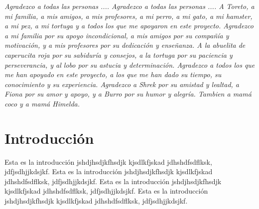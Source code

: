 \documentclass[12pt,letterpaper,spanish]{report}
\newenvironment{dedication}{\newpage\large\null\em\vskip1in}%
{\vfill}
\begin{document}
        \thispagestyle{empty}

        \begin{dedication}
           Agradezco a todas las personas .... Agradezco a todas las personas ....
           A Toreto, a mi familia, a mis amigos, a mis profesores, a mi perro, a mi gato, a mi hamster, a mi pez, a mi tortuga y a todos los que me apoyaron en este proyecto.
           Agradezco a mi familia por su apoyo incondicional, a mis amigos por su compañía y motivación, y a mis profesores por su dedicación y enseñanza.
           A la abuelita de caperucita roja por su sabiduría y consejos, a la tortuga por su paciencia y perseverancia, y al lobo por su astucia y determinación.
           Agradezco a todos los que me han apoyado en este proyecto, a los que me han dado su tiempo, su conocimiento y su experiencia.
           Agradezco a Shrek por su amistad y lealtad, a Fiona por su amor y apoyo, y a Burro por su humor y alegría.
           Tambien a mamá coco y a mamá Himelda.
        \end{dedication}




\tableofcontents



\oddsidemargin 0.2in \textwidth 6.5in \topmargin -0.25in
\textheight 9in \pagestyle{myheadings}

\newpage



\chapter{Introducción}
\newpage


Esta es la introducción jshdjhsdjkfhsdjk kjsdlkfjskad jdhshdfsdflksk, jdfjsdhjjkdsjkf.
Esta es la introducción jshdjhsdjkfhsdjk kjsdlkfjskad jdhshdfsdflksk, jdfjsdhjjkdsjkf.
Esta es la introducción jshdjhsdjkfhsdjk kjsdlkfjskad jdhshdfsdflksk, jdfjsdhjjkdsjkf.
Esta es la introducción jshdjhsdjkfhsdjk kjsdlkfjskad jdhshdfsdflksk, jdfjsdhjjkdsjkf.
\\
\end{document}
